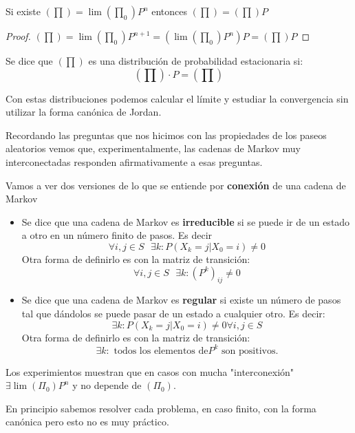 \obs Si existe $\left(\prod\right) = \lim \left(\prod_0\right) P^n$ entonces $\left(\prod\right) = \left(\prod\right) P$
\begin{proof}
	$\left(\prod\right) = \lim\left(\prod_0\right) P^{n+1} = \left(\lim \left(\prod_0\right)P^n\right)P = \left(\prod\right) P$
\end{proof}

\begin{defn}
	Se dice que $\left(\prod\right)$ es una distribución de probabilidad estacionaria si:
	$$\left(\prod\right)\cdot P = \left(\prod\right)$$
\end{defn}

\obs Con estas distribuciones podemos calcular el límite y estudiar la convergencia sin utilizar la forma canónica de Jordan.


Recordando las preguntas que nos hicimos con las propiedades de los paseos aleatorios vemos que, experimentalmente, las cadenas de Markov muy interconectadas responden afirmativamente a esas preguntas.

Vamos a ver dos versiones de lo que se entiende por \textbf{conexión} de una cadena de Markov
\newpage
\begin{itemize}
	\item \begin{defn}[Irreducible]
		Se dice que una cadena de Markov es \textbf{irreducible} si se puede ir de un estado a otro en un número finito de pasos. Es decir
		$$\forall i,j \in S\text{    }\exists k : P(X_k = j| X_0 = i) \neq 0$$
		Otra forma de definirlo es con la matriz de transición:
		$$\forall i,j \in S \text{    }\exists k: (P^k)_{ij} \neq 0$$
	\end{defn}
	\item \begin{defn}[Regular]
		Se dice que una cadena de Markov es \textbf{regular} si existe un número de pasos tal que dándolos se puede pasar de un estado a cualquier otro. Es decir:
		$$ \exists k : P(X_k = j| X_0 = i) \neq 0  \forall i,j \in S $$
		Otra forma de definirlo es con la matriz de transición:
		$$\exists k : \text{ todos los elementos de} P^k \text{ son positivos.}$$
	\end{defn}
\end{itemize}


Los experimientos muestran que en casos con mucha "interconexión" $\exists \lim (\Pi_0)P^n$ y no depende de $(\Pi_0)$.

En principio sabemos resolver cada problema, en caso finito, con la forma canónica pero esto no es muy práctico.
